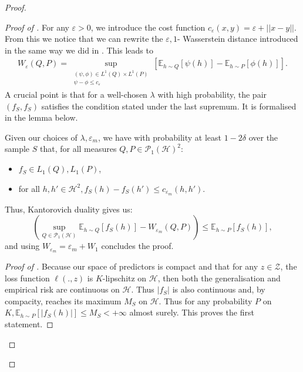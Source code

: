 \begin{noaddcontents}
\begin{proof}

\begin{proof}[Proof of ]
For any $\varepsilon>0$, we introduce the cost function $c_{\varepsilon}(x,y)= \varepsilon + ||x-y||$.
From this we notice that we can rewrite the $\varepsilon,1$- Wasserstein distance introduced in  the same way we did in . This leads to
\begin{align*}
W_\varepsilon(Q,P)= \sup_{\substack{(\psi, \phi) \in L^1(Q) \times L^1(P)\\ \psi-\phi \leq c_{\varepsilon}}}\left[\mathbb{E}_{h\sim Q}[ \psi(h)]- \mathbb{E}_{h\sim P}[ \phi(h)]\right].
\end{align*}
A crucial point is that for a well-chosen $\lambda$ with high probability, the pair $(f_S,f_S)$ satisfies the condition stated under the last supremum. It is formalised in the lemma below.
\begin{lemma}
\label{lem:kanto}
Given our choices of $\lambda,\varepsilon_m$, we have with probability at least $1-2\delta$ over the sample $S$ that, for all measures $Q,P\in\mathcal{P}_1(\mathcal{H})^2$:
\begin{itemize}
  \item $f_S\in L_1(Q),L_1(P)$,
  \item for all $h,h' \in \mathcal{H}^2, f_S(h)-f_S(h') \leq c_{\varepsilon_m}(h,h')$.
\end{itemize}
Thus, Kantorovich duality gives us:
\[ \left(\sup_{Q\in \mathcal{P}_1(\mathcal{H})} \mathbb{E}_{h\sim Q}[ f_S(h)] -  W_{\varepsilon_m}(Q,P) \right)\leq \mathbb{E}_{h\sim P}[ f_S(h)],    \]
and using $W_{\varepsilon_m} = \varepsilon_m + W_1$ concludes the proof.
\end{lemma}
\begin{proof}[Proof of ]
Because our space of predictors is compact and that for any $z\in\mathcal{Z}$, the loss function $\ell(.,z)$ is $K$-lipschitz on $\mathcal{H}$, then both the generalisation and empirical risk are continuous on $\mathcal{H}$. Thus $|f_S|$ is also continuous and, by compacity, reaches its maximum $M_S$ on $\mathcal{H}$. Thus for any probability $P$ on $K, \mathbb{E}_{h\sim P}[|f_S(h)|] \leq M_S < +\infty$ almost surely. This proves the first statement.

\end{proof}
\end{proof}
\end{proof}
\end{noaddcontents}
